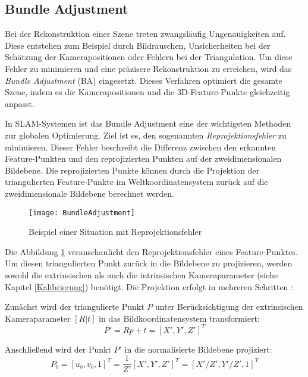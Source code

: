 \subsection{Bundle Adjustment}

Bei der Rekonstruktion einer Szene treten zwangsläufig Ungenauigkeiten auf. Diese entstehen zum Beispiel durch Bildrauschen, Unsicherheiten bei der Schätzung der Kamerapositionen oder Fehlern bei der Triangulation. Um diese Fehler zu minimieren und eine präzisere Rekonstruktion zu erreichen, wird das \textit{Bundle Adjustment} (BA) eingesetzt. Dieses Verfahren optimiert die gesamte Szene, indem es die Kamerapositionen und die 3D-Feature-Punkte gleichzeitig anpasst. \cite{gao2021vSLAM}

In SLAM-Systemen ist das Bundle Adjustment eine der wichtigsten Methoden zur globalen Optimierung. Ziel ist es, den sogenannten \textit{Reprojektionsfehler} zu minimieren. Dieser Fehler beschreibt die Differenz zwischen den erkannten Feature-Punkten und den reprojizierten Punkten auf der zweidimensionalen Bildebene. Die reprojizierten Punkte können durch die Projektion der triangulierten Feature-Punkte im Weltkoordinatensystem zurück auf die zweidimensionale Bildebene berechnet werden. \cite{gao2021vSLAM}

\begin{figure}
    \centering
    \texttt{[image: BundleAdjustment]}
    \caption{Beispiel einer Situation mit Reprojektionsfehler \cite{kumar2024bundleAdjustment}\label{fig:BA}}\par
\end{figure}

Die Abbildung \ref{fig:BA} veranschaulicht den Reprojektionsfehler eines Feature-Punktes. Um diesen triangulierten Punkt zurück in die Bildebene zu projizieren, werden sowohl die extrinsischen als auch die intrinsischen Kameraparameter (siehe Kapitel \ref{Kalibrierung}) benötigt. Die Projektion erfolgt in mehreren Schritten \cite{gao2021vSLAM}:

Zunächst wird der triangulierte Punkt \( P \) unter Berücksichtigung der extrinsischen Kameraparameter \( [R|t] \) in das Bildkoordinatensystem transformiert:
\begin{equation}
    P' = Rp+t = [X', Y', Z']^T
\end{equation}

Anschließend wird der Punkt \( P' \) in die normalisierte Bildebene projiziert:
\begin{equation}
    P_b = [u_b, v_b, 1]^T = \frac{1}{Z'}[X', Y', Z']^T = [X'/Z', Y'/Z', 1]^T
\end{equation}

